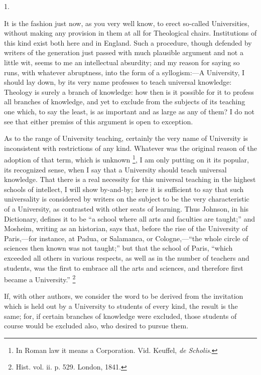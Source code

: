 1.

It is the fashion just now, as you very well know, to erect
so-called Universities, without making any provision in them at all
for Theological chairs. Institutions of this kind exist both here and
in England. Such a procedure, though defended by writers of the
generation just passed with much plausible argument and not a little
wit, seems to me an intellectual absurdity; and my reason for saying
so runs, with whatever abruptness, into the form of a syllogism:—A
University, I should lay down, by its very name professes to
teach universal knowledge: Theology is surely a branch of knowledge:
how then is it possible for it to profess all branches of knowledge,
and yet to exclude from the subjects of its teaching one which, to say
the least, is as important and as large as any of them? I do not see
that either premiss of this argument is open to exception.

As to the range of University teaching, certainly the very name of
University is inconsistent with restrictions of any kind. Whatever was
the original reason of the adoption of that term, which is unknown \footnote{In Roman law it means a Corporation. Vid. Keuffel, \emph{de Scholis}.}, I am only putting on it its popular, its recognized sense,
when I say that a University should teach universal knowledge. That
there is a real necessity for this universal teaching in the highest
schools of intellect, I will show by-and-by; here it is sufficient to
say that such universality is considered by writers on the subject to
be the very characteristic of a University, as contrasted with other
seats of learning. Thus Johnson, in his Dictionary, defines it to be
``a school where all arts and faculties are taught;'' and
Mosheim, writing as an historian, says that, before the rise of the
University of Paris,—for instance, at Padua, or Salamanca, or
Cologne,—``the whole circle of sciences then known was not
taught;'' but that the school of Paris, ``which exceeded all
others in various respects, as well as in the number of teachers and
students, was the first to embrace all the arts and sciences, and
therefore first became a University.'' \footnote{Hist. vol. ii. p. 529. London, 1841.}

If, with other authors, we consider the word to be derived from the
invitation which is held out by a University to students of every
kind, the result is the same; for, if certain branches of knowledge
were excluded, those students of course would be excluded also,
who desired to pursue them.


